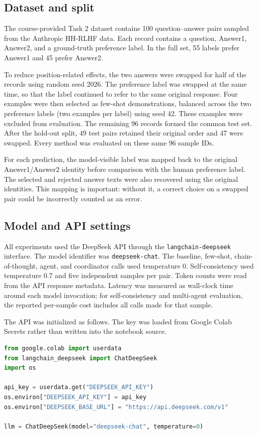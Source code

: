 \documentclass[10pt]{article}
\begin{document}
\subsection{Dataset and split}
The course-provided Task 2 dataset contains 100 question--answer pairs sampled from the Anthropic HH-RLHF data. Each record contains a question, Answer1, Answer2, and a ground-truth preference label. In the full set, 55 labels prefer Answer1 and 45 prefer Answer2.

To reduce position-related effects, the two answers were swapped for half of the records using random seed 2026. The preference label was swapped at the same time, so that the label continued to refer to the same original response. Four examples were then selected as few-shot demonstrations, balanced across the two preference labels (two examples per label) using seed 42. These examples were excluded from evaluation. The remaining 96 records formed the common test set. After the hold-out split, 49 test pairs retained their original order and 47 were swapped. Every method was evaluated on these same 96 sample IDs.

For each prediction, the model-visible label was mapped back to the original Answer1/Answer2 identity before comparison with the human preference label. The selected and rejected answer texts were also recovered using the original identities. This mapping is important: without it, a correct choice on a swapped pair could be incorrectly counted as an error.

\subsection{Model and API settings}
All experiments used the DeepSeek API through the \texttt{langchain-deepseek} interface. The model identifier was \texttt{deepseek-chat}. The baseline, few-shot, chain-of-thought, agent, and coordinator calls used temperature 0. Self-consistency used temperature 0.7 and five independent samples per pair. Token counts were read from the API response metadata. Latency was measured as wall-clock time around each model invocation; for self-consistency and multi-agent evaluation, the reported per-sample cost includes all calls made for that sample.

The API was initialized as follows. The key was loaded from Google Colab Secrets rather than written into the notebook source.
\begin{lstlisting}[language=Python]
from google.colab import userdata
from langchain_deepseek import ChatDeepSeek
import os

api_key = userdata.get("DEEPSEEK_API_KEY")
os.environ["DEEPSEEK_API_KEY"] = api_key
os.environ["DEEPSEEK_BASE_URL"] = "https://api.deepseek.com/v1"

llm = ChatDeepSeek(model="deepseek-chat", temperature=0)
\end{lstlisting}
\end{document}
